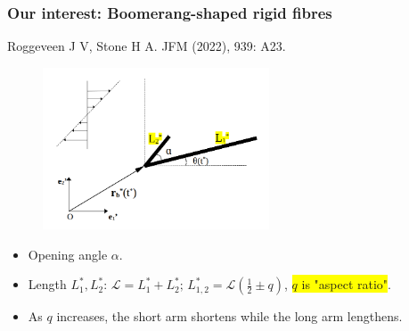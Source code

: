\documentclass{beamer}
\newcommand{\bi}{\begin{itemize}}
\newcommand{\ei}{\end{itemize}}
\begin{document}
\begin{frame}
	\frametitle{Our interest: Boomerang-shaped rigid fibres}
	\begin{overlayarea}{\textwidth}{\textheight}
		\vspace{-0.5cm}\footnotesize Roggeveen J V, Stone H A. JFM (2022), 939: A23.\vspace{-0.2cm}
		\begin{figure}[htb]
			\begin{center}
				\includegraphics[width=0.6\textwidth]{plots/schematic/schematic_rigid_configuration_q.png}
			\end{center}
		\end{figure}\vspace{-0.3cm}
		\small \bi
		\item Opening angle $\alpha$. 
		\item Length $L_1^*,L_2^*$: $\mathcal{L}=L_1^*+L_2^*;\, L_{1,2}^*=\mathcal{L}(\frac{1}{2}\pm q)$, \colorbox{yellow}{$q$ is "aspect ratio"}.
		\item As $q$ increases, the short arm shortens while the long arm lengthens.
		\ei 
	\end{overlayarea}
\end{frame}


\end{document}

